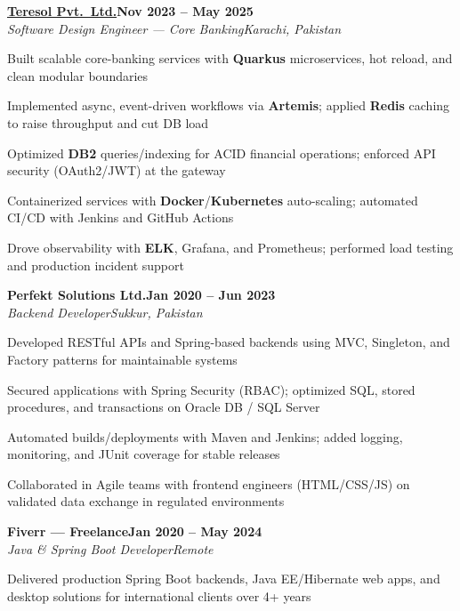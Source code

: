 \documentclass[letterpaper,10pt]{article}
\newcommand{\heading}[2]{
  \hspace{8pt}#1\hfill#2\\
}
\newcommand{\headingBf}[2]{
  \heading{\textbf{#1}}{\textbf{#2}}
}
\newcommand{\headingIt}[2]{
  \heading{\textit{#1}}{\textit{#2}}
}
\newenvironment{resume_list}{
  \vspace{-6pt}
  \begin{itemize}[itemsep=-1px, parsep=0.5pt, topsep=1pt, leftmargin=22pt]
}{
  \end{itemize}
  \vspace{-2pt}
}
\begin{document}
\vspace{2pt}
\headingBf{\href{https://teresol.com/}{Teresol Pvt.\ Ltd.}}{Nov 2023 -- May 2025}
\headingIt{Software Design Engineer --- Core Banking}{Karachi, Pakistan}
\begin{resume_list}
  \item Built scalable core-banking services with \textbf{Quarkus} microservices, hot reload, and clean modular boundaries
  \item Implemented async, event-driven workflows via \textbf{Artemis}; applied \textbf{Redis} caching to raise throughput and cut DB load
  \item Optimized \textbf{DB2} queries/indexing for ACID financial operations; enforced API security (OAuth2/JWT) at the gateway
  \item Containerized services with \textbf{Docker}/\textbf{Kubernetes} auto-scaling; automated CI/CD with Jenkins and GitHub Actions
  \item Drove observability with \textbf{ELK}, Grafana, and Prometheus; performed load testing and production incident support
\end{resume_list}

\vspace{2pt}
\headingBf{Perfekt Solutions Ltd.}{Jan 2020 -- Jun 2023}
\headingIt{Backend Developer}{Sukkur, Pakistan}
\begin{resume_list}
  \item Developed RESTful APIs and Spring-based backends using MVC, Singleton, and Factory patterns for maintainable systems
  \item Secured applications with Spring Security (RBAC); optimized SQL, stored procedures, and transactions on Oracle DB / SQL Server
  \item Automated builds/deployments with Maven and Jenkins; added logging, monitoring, and JUnit coverage for stable releases
  \item Collaborated in Agile teams with frontend engineers (HTML/CSS/JS) on validated data exchange in regulated environments
\end{resume_list}

\vspace{2pt}
\headingBf{Fiverr --- Freelance}{Jan 2020 -- May 2024}
\headingIt{Java \& Spring Boot Developer}{Remote}
\begin{resume_list}
  \item Delivered production Spring Boot backends, Java EE/Hibernate web apps, and desktop solutions for international clients over 4+ years
\end{resume_list}
\end{document}
